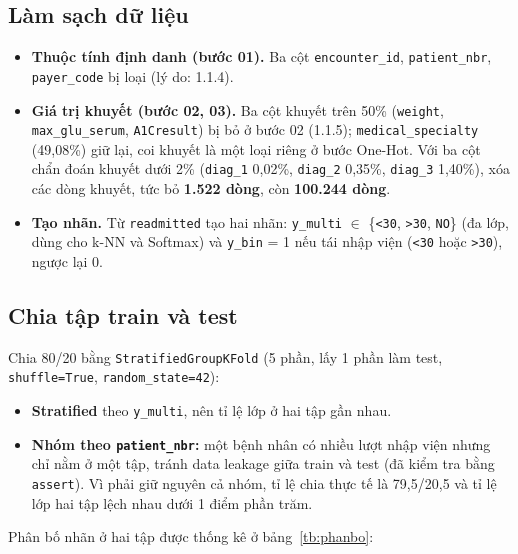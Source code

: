 \documentclass[a4paper]{report}
\begin{document}
\subsection{Làm sạch dữ liệu}

\begin{itemize}
  \item \textbf{Thuộc tính định danh (bước 01).} Ba cột \texttt{encounter\_\allowbreak{}id}, \texttt{patient\_\allowbreak{}nbr}, \texttt{payer\_\allowbreak{}code} bị loại (lý do: 1.1.4).
  \item \textbf{Giá trị khuyết (bước 02, 03).} Ba cột khuyết trên 50\% (\texttt{weight}, \texttt{max\_\allowbreak{}glu\_\allowbreak{}serum}, \texttt{A1Cresult}) bị bỏ ở bước 02 (1.1.5); \texttt{medical\_\allowbreak{}specialty} (49,08\%) giữ lại, coi khuyết là một loại riêng ở bước One-Hot. Với ba cột chẩn đoán khuyết dưới 2\% (\texttt{diag\_\allowbreak{}1} 0,02\%, \texttt{diag\_\allowbreak{}2} 0,35\%, \texttt{diag\_\allowbreak{}3} 1,40\%), xóa các dòng khuyết, tức bỏ \textbf{1.522 dòng}, còn \textbf{100.244 dòng}.
  \item \textbf{Tạo nhãn.} Từ \texttt{readmitted} tạo hai nhãn: \texttt{y\_\allowbreak{}multi} $\in$ \{\texttt{<30}, \texttt{>30}, \texttt{NO}\} (đa lớp, dùng cho k-NN và Softmax) và \texttt{y\_\allowbreak{}bin} = 1 nếu tái nhập viện (\texttt{<30} hoặc \texttt{>30}), ngược lại 0.
\end{itemize}

\subsection{Chia tập train và test}

Chia 80/20 bằng \texttt{StratifiedGroupKFold} (5 phần, lấy 1 phần làm test, \texttt{shuffle=True}, \texttt{random\_\allowbreak{}state=42}):

\begin{itemize}
  \item \textbf{Stratified} theo \texttt{y\_\allowbreak{}multi}, nên tỉ lệ lớp ở hai tập gần nhau.
  \item \textbf{Nhóm theo \texttt{patient\_\allowbreak{}nbr}:} một bệnh nhân có nhiều lượt nhập viện nhưng chỉ nằm ở một tập, tránh data leakage giữa train và test (đã kiểm tra bằng \texttt{assert}). Vì phải giữ nguyên cả nhóm, tỉ lệ chia thực tế là 79,5/20,5 và tỉ lệ lớp hai tập lệch nhau dưới 1 điểm phần trăm.
\end{itemize}

Phân bố nhãn ở hai tập được thống kê ở bảng~\ref{tb:phanbo}:
\end{document}
